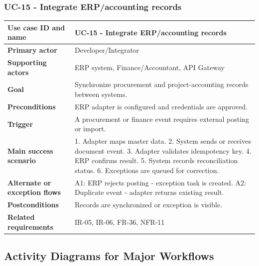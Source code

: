 \documentclass[11pt,a4paper]{article}
\begin{document}
\subsubsection{UC-15 - Integrate ERP/accounting records}
\begin{footnotesize}
\begin{longtable}{@{}p{}p{}@{}}
\rowcolor{gray!10}\textbf{Use case ID and name} & UC-15 - Integrate ERP/accounting records \\ \hline
\rowcolor{gray!10}\textbf{Primary actor} & Developer/Integrator \\ \hline
\rowcolor{gray!10}\textbf{Supporting actors} & ERP system, Finance/Accountant, API Gateway \\ \hline
\rowcolor{gray!10}\textbf{Goal} & Synchronize procurement and project-accounting records between systems. \\ \hline
\rowcolor{gray!10}\textbf{Preconditions} & ERP adapter is configured and credentials are approved. \\ \hline
\rowcolor{gray!10}\textbf{Trigger} & A procurement or finance event requires external posting or import. \\ \hline
\rowcolor{gray!10}\textbf{Main success scenario} & 1. Adapter maps master data. 2. System sends or receives document event. 3. Adapter validates idempotency key. 4. ERP confirms result. 5. System records reconciliation status. 6. Exceptions are queued for correction. \\ \hline
\rowcolor{gray!10}\textbf{Alternate or exception flows} & A1: ERP rejects posting - exception task is created. A2: Duplicate event - adapter returns existing result. \\ \hline
\rowcolor{gray!10}\textbf{Postconditions} & Records are synchronized or exception is visible. \\ \hline
\rowcolor{gray!10}\textbf{Related requirements} & IR-05, IR-06, FR-36, NFR-11 \\ \hline
\end{longtable}
\end{footnotesize}


\subsection{Activity Diagrams for Major Workflows}
\end{document}
